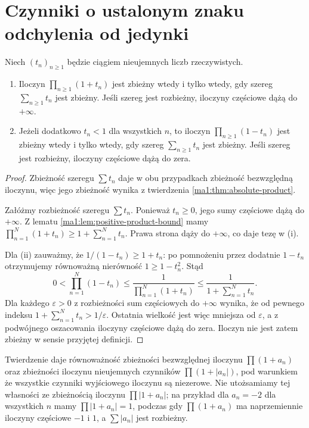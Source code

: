 \section{Czynniki o ustalonym znaku odchylenia od jedynki}
\begin{twierdzenie}
\label{ma1:thm:positive-product-series}
Niech $(t_n)_{n\ge1}$ będzie ciągiem nieujemnych liczb rzeczywistych.
\begin{enumerate}[label=(\roman*)]
\item Iloczyn $\prod_{n\ge1}(1+t_n)$ jest zbieżny wtedy i tylko wtedy, gdy szereg $\sum_{n\ge1}t_n$ jest zbieżny. Jeśli szereg jest rozbieżny, iloczyny częściowe dążą do $+\infty$.
\item Jeżeli dodatkowo $t_n<1$ dla wszystkich $n$, to iloczyn $\prod_{n\ge1}(1-t_n)$ jest zbieżny wtedy i tylko wtedy, gdy szereg $\sum_{n\ge1}t_n$ jest zbieżny. Jeśli szereg jest rozbieżny, iloczyny częściowe dążą do zera.
\end{enumerate}
\end{twierdzenie}
\begin{proof}
Zbieżność szeregu $\sum t_n$ daje w obu przypadkach zbieżność bezwzględną iloczynu, więc jego zbieżność wynika z twierdzenia \ref{ma1:thm:absolute-product}.

Załóżmy rozbieżność szeregu $\sum t_n$. Ponieważ $t_n\ge0$, jego sumy częściowe dążą do $+\infty$. Z lematu \ref{ma1:lem:positive-product-bound} mamy
$\prod_{n=1}^N(1+t_n)\ge1+\sum_{n=1}^N t_n$.
Prawa strona dąży do $+\infty$, co daje tezę w (i).

Dla (ii) zauważmy, że $1/(1-t_n)\ge1+t_n$: po pomnożeniu przez dodatnie $1-t_n$ otrzymujemy równoważną nierówność $1\ge1-t_n^2$. Stąd
\[
 0<\prod_{n=1}^N(1-t_n)
 \le\frac1{\prod_{n=1}^N(1+t_n)}
 \le\frac1{1+\sum_{n=1}^N t_n}.
\]
Dla każdego $\varepsilon>0$ z rozbieżności sum częściowych do $+\infty$ wynika, że od pewnego indeksu $1+\sum_{n=1}^N t_n>1/\varepsilon$. Ostatnia wielkość jest więc mniejsza od $\varepsilon$, a z podwójnego oszacowania iloczyny częściowe dążą do zera. Iloczyn nie jest zatem zbieżny w sensie przyjętej definicji.
\end{proof}
\begin{uwaga}
Twierdzenie daje równoważność zbieżności bezwzględnej iloczynu $\prod(1+a_n)$ oraz zbieżności iloczynu nieujemnych czynników $\prod(1+|a_n|)$, pod warunkiem że wszystkie czynniki wyjściowego iloczynu są niezerowe. Nie utożsamiamy tej własności ze zbieżnością iloczynu $\prod |1+a_n|$; na przykład dla $a_n=-2$ dla wszystkich $n$ mamy $\prod |1+a_n|=1$, podczas gdy $\prod(1+a_n)$ ma naprzemiennie iloczyny częściowe $-1$ i $1$, a $\sum|a_n|$ jest rozbieżny.
\end{uwaga}

